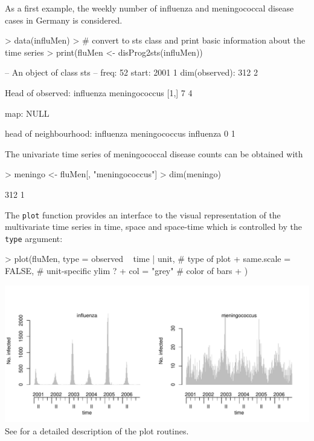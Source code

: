 \documentclass[a4paper,11pt]{article}
\newcommand{\code}[1]{\texttt{#1}}
\begin{document}
As a first example, the weekly number of influenza and meningococcal disease 
cases in Germany is considered.
\begin{Schunk}
\begin{Sinput}
> data(influMen)
> # convert to sts class and print basic information about the time series
> print(fluMen <- disProg2sts(influMen))
\end{Sinput}
\begin{Soutput}
-- An object of class sts -- 
freq:		 52 
start:		 2001 1 
dim(observed):	 312 2 

Head of observed:
     influenza meningococcus
[1,]         7             4

map:
NULL

head of neighbourhood:
          influenza meningococcus
influenza         0             1
\end{Soutput}
\end{Schunk}
The univariate time series of meningococcal disease counts can be obtained
with
\begin{Schunk}
\begin{Sinput}
> meningo <- fluMen[, "meningococcus"]
> dim(meningo)
\end{Sinput}
\begin{Soutput}
[1] 312   1
\end{Soutput}
\end{Schunk}
The \code{plot} function provides an interface to the visual representation
of the multivariate time series in time, space and space-time which is
controlled by the \code{type} argument:
\begin{Schunk}
\begin{Sinput}
> plot(fluMen, type = observed ~ time | unit, # type of plot
+              same.scale = FALSE,            # unit-specific ylim ?
+              col = "grey"                   # color of bars
+              )
\end{Sinput}
\end{Schunk}
\includegraphics{figs/vignette_hhh4-fluMen}
See \cite{hoehle-mazick-2010} for a detailed description of the plot routines.\\
\end{document}
